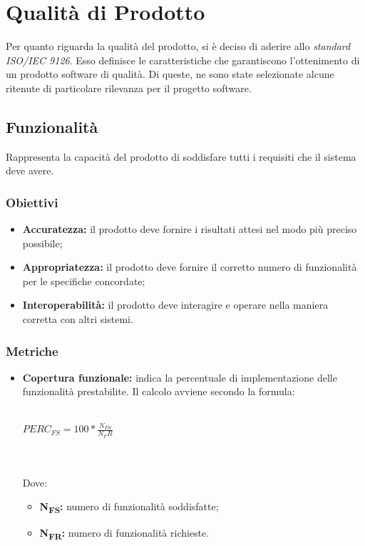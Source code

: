 \section{Qualità di Prodotto}
Per quanto riguarda la qualità del prodotto, si è deciso di aderire allo \textit{standard ISO/IEC 9126\glos}. Esso definisce le caratteristiche che garantiscono l'ottenimento di un prodotto software di qualità. Di queste, ne sono state selezionate alcune ritenute di particolare rilevanza per il progetto software.

\subsection{Funzionalità}
Rappresenta la capacità del prodotto di soddisfare tutti i requisiti che il sistema deve avere.
\subsubsection{Obiettivi}
\begin{itemize}
	\item \textbf{Accuratezza:} il prodotto deve fornire i risultati attesi nel modo più preciso possibile;
	\item \textbf{Appropriatezza:} il prodotto deve fornire il corretto numero di funzionalità per le specifiche concordate;
	\item \textbf{Interoperabilità:} il prodotto deve interagire e operare nella maniera corretta con altri sistemi.
\end{itemize}
\subsubsection{Metriche}
\begin{itemize}
	\item \textbf{Copertura funzionale:} indica la percentuale di implementazione delle funzionalità prestabilite. Il calcolo avviene secondo la formula:\\\\
	\centerline{
		\begin{math}
		PERC_{FS}=100*\frac{N_{FS}}{N_FR}
		\end{math}
	}
	\\\\
	Dove:
	\begin{itemize}
		\item \textbf{N\textsubscript{FS}:} numero di funzionalità soddisfatte;
		\item \textbf{N\textsubscript{FR}:} numero di funzionalità richieste.
	\end{itemize}
\end{itemize}

